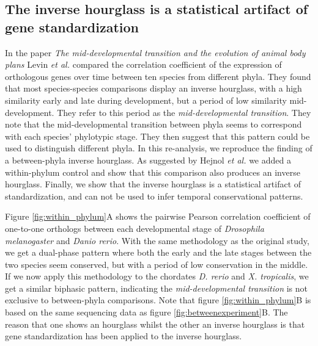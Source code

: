 \subsection{The inverse hourglass is a statistical artifact of gene standardization} \label{subsection:levin}

In the paper \textit{The mid-developmental transition and the evolution of animal body plans}\cite{Levin2016} Levin \textit{et al.} compared the correlation coefficient of the expression of orthologous genes over time between ten species from different phyla. They found that most species-species comparisons display an inverse hourglass, with a high similarity early and late during development, but a period of low similarity mid-development. They refer to this period as the \textit{mid-developmental transition}. They note that the mid-developmental transition between phyla seems to correspond with each species' phylotypic stage. They then suggest that this pattern could be used to distinguish different phyla. In this re-analysis, we reproduce the finding of a between-phyla inverse hourglass. As suggested by Hejnol \textit{et al.}\cite{hejnol2016} we added a within-phylum control and show that this comparison also produces an inverse hourglass. Finally, we show that the inverse hourglass is a statistical artifact of standardization, and can not be used to infer temporal conservational patterns.

Figure \ref{fig:within_phylum}A shows the pairwise Pearson correlation coefficient of one-to-one orthologs between each developmental stage of \textit{Drosophila melanogaster} and \textit{Danio rerio}. With the same methodology as the original study, we get a dual-phase pattern where both the early and the late stages between the two species seem conserved, but with a period of low conservation in the middle. If we now apply this methodology to the chordates \textit{D. rerio} and \textit{X. tropicalis}, we get a similar biphasic pattern, indicating the \textit{mid-developmental transition} is not exclusive to between-phyla comparisons. Note that figure \ref{fig:within_phylum}B is based on the same sequencing data as figure \ref{fig:betweenexperiment}B. The reason that one shows an hourglass whilst the other an inverse hourglass is that gene standardization has been applied to the inverse hourglass.

